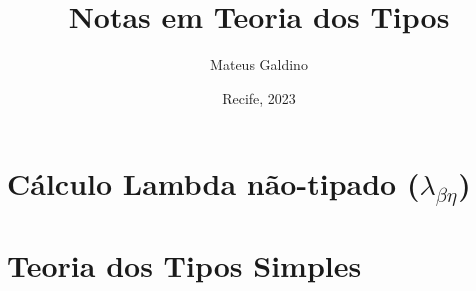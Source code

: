 \documentclass{article}
\title{Notas em Teoria dos Tipos}
\author{Mateus Galdino}
\date{Recife, 2023}
\theoremstyle{definition}
\theoremstyle{lemma}
\theoremstyle{theorem}
\theoremstyle{corollary}
\begin{document}
    \maketitle

    \tableofcontents

    \newpage

        

    \newpage

        \section{Cálculo Lambda não-tipado ($\lambda_{\beta\eta}$)}
        

    \newpage
        \section{Teoria dos Tipos Simples}
        
    \newpage
\end{document}
